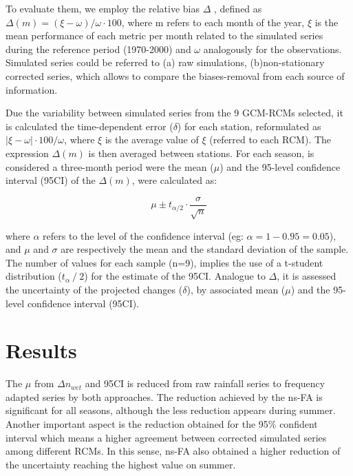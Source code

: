 \documentclass[a4paper,11pt]{article}
\begin{document}
To evaluate them, we employ the relative bias $\Delta$ \cite{bib9}, defined as $\Delta(m) =(\xi-\omega)/\omega \cdot 100$, where m refers to each month of the year, $\xi$ is the mean performance of each metric per month related to the simulated series during the reference period (1970-2000) and $\omega$ analogously for the observations. Simulated series could be referred to (a) raw simulations, (b)non-stationary corrected series, which allows to compare the biases-removal from each source of information. 

Due the variability between simulated series from the 9 GCM-RCMs selected, it is calculated the time-dependent error ($\delta$) for each station, reformulated as $ \lvert{\xi} - {\omega}\rvert \cdot 100/ \omega$, where ${\xi}$ is the average value of $\xi$ (referred to each RCM). The expression $\Delta(m)$ is then averaged between stations. For each season, is considered a three-month period were the mean ($\mu$) and the 95-level confidence interval (95CI) of the  $\Delta(m)$, were calculated as: 

\begin{equation}
\mu \pm t_{\alpha/2} \cdot \dfrac{\sigma}{\sqrt{n}}
\label{E2}
\end{equation}

where $\alpha$  refers to the level of the confidence interval (eg: $\alpha = 1 - 0.95 = 0.05$), and $\mu$ and $\sigma$ are respectively the mean and the standard deviation of the sample. The number of values for each sample (n=9), implies the use of a t-student distribution ($t_\alpha⁄2$) for the estimate of the 95CI. Analogue to $\Delta$, it is assessed the uncertainty of the projected changes ($\delta$), by associated mean ($\mu$) and the 95-level confidence interval (95CI). 


\section{Results}\label{sec4}

The $\mu$ from $\Delta n_{wet}$  and 95CI  is reduced from raw rainfall series to frequency adapted series by both approaches. The reduction achieved by the ns-FA is significant for all seasons, although the less reduction appears during summer. Another important aspect is the reduction obtained for the 95\% confident interval which means a higher agreement between corrected simulated series among different RCMs. In this sense, ns-FA also obtained a higher reduction of the uncertainty reaching the highest value on summer. 
\end{document}

